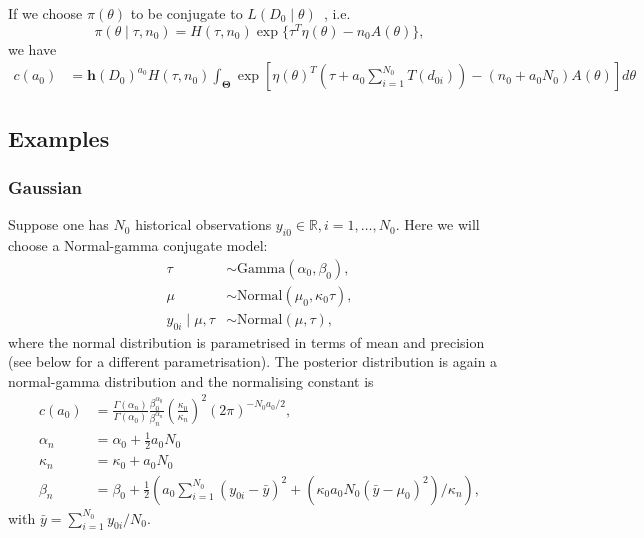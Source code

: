 \documentclass[a4paper, notitlepage, 11pt]{article}
\begin{document}
If we choose $\pi(\theta)$ to be conjugate to $L(D_0 \mid \theta)$~\citep{Diaconis1979}, i.e.
\begin{equation}
 \label{eq:conj_exp_family}
 \pi(\theta \mid \tau, n_0) = H(\tau, n_0) \exp\{ \tau^T\eta(\theta) - n_0A(\theta) \},
\end{equation}
we have 
\begin{align}
 \label{eq:expo_family_const_conj}
 c(a_0) &= \boldsymbol h(D_0)^{a_0} H(\tau, n_0) \int_{\boldsymbol\Theta}  \exp \left[ \eta(\theta)^T \left( \tau + a_0\sum_{i=1}^{N_0} T(d_{0i}) \right) -(n_0  + a_0N_0) A(\theta) \right] d\theta
\end{align}

\subsection{Examples}
\subsubsection{Gaussian}

Suppose one has $N_0$ historical observations $y_{i0} \in \mathbb{R}, i = 1, \ldots, N_0$.
Here we will choose a Normal-gamma conjugate model:
\begin{align*}
 \tau &\sim \text{Gamma}(\alpha_0, \beta_0),\\
 \mu &\sim \text{Normal}(\mu_0, \kappa_0\tau ),\\
 y_{0i} \mid \mu, \tau &\sim \text{Normal}(\mu, \tau),
\end{align*}
where the normal distribution is parametrised in terms of mean and precision (see below for a different parametrisation).
The posterior distribution is again a normal-gamma distribution and the normalising constant is
\begin{align}
 \label{eq:cA0_gaussian}
 c(a_0) &= \frac{\Gamma(\alpha_n)}{\Gamma(\alpha_0)}\frac{\beta_0^{\alpha_0}}{\beta_n^{\alpha_n}} \left(\frac{\kappa_0}{\kappa_n} \right)^2 (2\pi)^{-N_0 a_0/2},\\
 \nonumber
 \alpha_n &= \alpha_0 + \frac{1}{2}a_0N_0 \\
 \nonumber
 \kappa_n &= \kappa_0 + a_0N_0 \\
 \nonumber
 \beta_n  &= \beta_0 + \frac{1}{2}\left( a_0\sum_{i=1}^{N_0}(y_{0i}-\bar{y})^2 + \left(\kappa_0 a_0 N_0 (\bar{y}-\mu_0)^2\right)/\kappa_n \right),
\end{align}
with $\bar{y} = \sum_{i=1}^{N_0} y_{0i}/N_0$.
\end{document}
